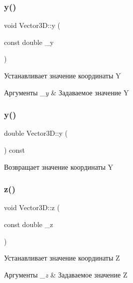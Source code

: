 \subsubsection{\texorpdfstring{y()}{y()}\hspace{0.1cm}{\footnotesize\ttfamily [1/2]}}
{\footnotesize\ttfamily void Vector3\+D\+::y (\begin{DoxyParamCaption}\item[{const double}]{\+\_\+y }\end{DoxyParamCaption})}

Устанавливает значение координаты Y 
\begin{DoxyParams}{Аргументы}
{\em \+\_\+y} & Задаваемое значение Y \\
\hline
\end{DoxyParams}
\mbox{\label{class_vector3_d_a7146d35db2c1bf7606c8290282a423ec}} 
\subsubsection{\texorpdfstring{y()}{y()}\hspace{0.1cm}{\footnotesize\ttfamily [2/2]}}
{\footnotesize\ttfamily double Vector3\+D\+::y (\begin{DoxyParamCaption}{ }\end{DoxyParamCaption}) const}

Возвращает значение координаты Y \mbox{\label{class_vector3_d_a08e854517896eedfaf20fc059e6ba468}} 
\subsubsection{\texorpdfstring{z()}{z()}\hspace{0.1cm}{\footnotesize\ttfamily [1/2]}}
{\footnotesize\ttfamily void Vector3\+D\+::z (\begin{DoxyParamCaption}\item[{const double}]{\+\_\+z }\end{DoxyParamCaption})}

Устанавливает значение координаты Z 
\begin{DoxyParams}{Аргументы}
{\em \+\_\+z} & Задаваемое значение Z \\
\hline
\end{DoxyParams}
\mbox{\label{class_vector3_d_af4ae427e82a23af845f804106daed509}} 
